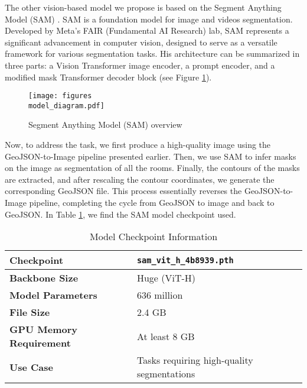 \documentclass{article}
\begin{document}
The other vision-based model we propose is based on the Segment Anything Model (SAM) \cite{kirillov2023segment}. SAM is a foundation model for image and videos segmentation. Developed by Meta's FAIR (Fundamental AI Research) lab, SAM represents a significant advancement in computer vision, designed to serve as a versatile framework for various segmentation tasks. His architecture can be summarized in three parts: a Vision Transformer image encoder, a prompt encoder, and a modified mask Transformer decoder block (see Figure \ref{label}).

\begin{figure}[h!]
    \centering
    \texttt{[image: figures\\model\_diagram.pdf]}
    \caption{Segment Anything Model (SAM) overview}
    \label{label}
\end{figure}

Now, to address the task, we first produce a high-quality image using the GeoJSON-to-Image pipeline presented earlier. Then, we use SAM to infer masks on the image as segmentation of all the rooms. Finally, the contours of the masks are extracted, and after rescaling the contour coordinates, we generate the corresponding GeoJSON file. This process essentially reverses the GeoJSON-to-Image pipeline, completing the cycle from GeoJSON to image and back to GeoJSON. In Table \ref{tab:model_checkpoint}, we find the SAM model checkpoint used.

\begin{table}[h]
    \centering
    \begin{tabular}{|l|l|}
        \hline
        \textbf{Checkpoint} & \texttt{sam\_vit\_h\_4b8939.pth} \\ \hline
        \textbf{Backbone Size} & Huge (ViT-H) \\ \hline
        \textbf{Model Parameters} & 636 million \\ \hline
        \textbf{File Size} & 2.4 GB \\ \hline
        \textbf{GPU Memory Requirement} & At least 8 GB \\ \hline
        \textbf{Use Case} & Tasks requiring high-quality segmentations \\ \hline
    \end{tabular}
    \caption{Model Checkpoint Information}
    \label{tab:model_checkpoint}
\end{table}




\end{document}
